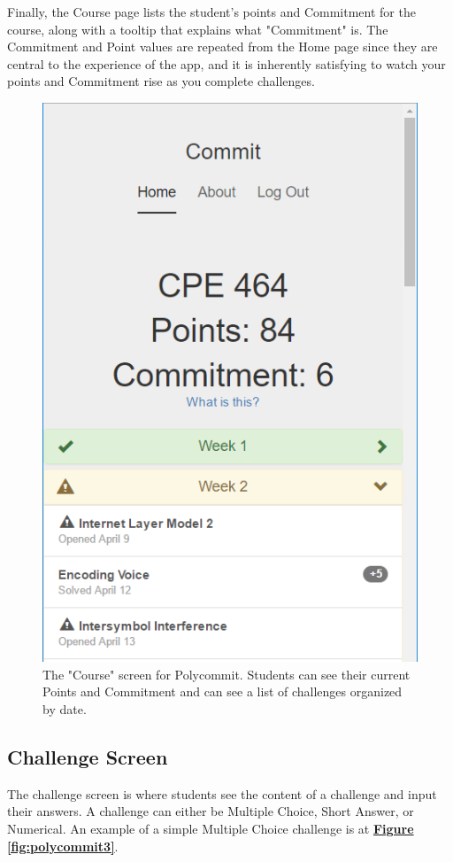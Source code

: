 \par Finally, the Course page lists the student's points and Commitment for the course, along with a tooltip that explains what "Commitment" is. The Commitment and Point values are repeated from the Home page since they are central to the experience of the app, and it is inherently satisfying to watch your points and Commitment rise as you complete challenges.

\begin{figure}
	\includegraphics{figures/polycommit-challenges}
	\caption{The "Course" screen for Polycommit. Students can see their current Points and Commitment and can see a list of challenges organized by date.}
	\label{fig:polycommit2}
\end{figure}

\subsection{Challenge Screen}
\par The challenge screen is where students see the content of a challenge and input their answers. A challenge can either be Multiple Choice, Short Answer, or Numerical. An example of a simple Multiple Choice challenge is at \textbf{\hyperref[fig:polycommit3]{Figure \ref*{fig:polycommit3}}}.

